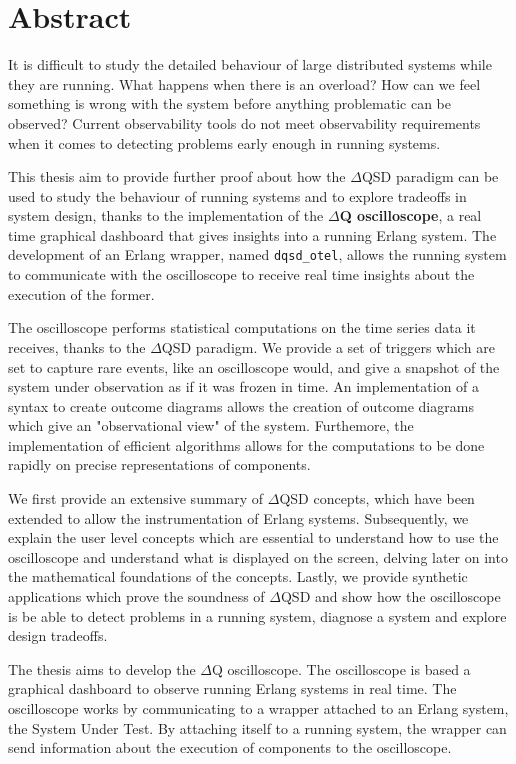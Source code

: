 \chapter*{Abstract}
    It is difficult to study the detailed behaviour of large distributed systems while they are running. What happens when there is an overload? How can we feel something is wrong with the system before anything problematic can be observed? Current observability tools do not meet observability requirements when it comes to detecting problems early enough in running systems. 
    
    This thesis aim to provide further proof about how the $\Delta$QSD paradigm can be used to study the behaviour of running systems and to explore tradeoffs in system design, thanks to the implementation of the \textbf{$\Delta$Q oscilloscope}, a real time graphical dashboard that gives insights into a running Erlang system. The development of an Erlang wrapper, named \texttt{dqsd\_otel}, allows the running system to communicate with the oscilloscope to receive real time insights about the execution of the former.
    
    The oscilloscope performs statistical computations on the time series data it receives, thanks to the $\Delta$QSD paradigm. We provide a set of triggers which are set to capture rare events, like an oscilloscope would, and give a snapshot of the system under observation as if it was frozen in time. An implementation of a syntax to create outcome diagrams allows the creation of outcome diagrams which give an "observational view" of the system. Furthemore, the implementation of efficient algorithms allows for the computations to be done rapidly on precise representations of components.

    We first provide an extensive summary of $\Delta$QSD concepts, which have been extended to allow the instrumentation of Erlang systems. Subsequently, we explain the user level concepts which are essential to understand how to use the oscilloscope and understand what is displayed on the screen, delving later on into the mathematical foundations of the concepts. Lastly, we provide synthetic applications which prove the soundness of $\Delta$QSD and show how the oscilloscope is be able to detect problems in a running system, diagnose a system and explore design tradeoffs.


\iffalse
    The thesis aims to develop the $\Delta$Q oscilloscope. The oscilloscope is based a graphical dashboard to observe running Erlang systems in real time. The oscilloscope works by communicating to a wrapper attached to an Erlang system, the System Under Test. By attaching itself to a running system, the wrapper can send information about the execution of components to the oscilloscope.

